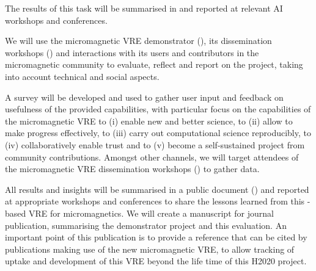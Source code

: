 \begin{workpackage}[id=social-aspects,wphases=0-48,
  title=Social Aspects,
  lead=UO,
  UORM=23,USHRM=18,USORM=6]
\begin{tasklist}
\begin{task}[title=Mechanism Design for Free Software Development,PM=15,lead=UO,
  wphases=6-48!.5,id=isocial-decisionmaking]
The results of this task will be summarised in 
and reported at relevant AI workshops and conferences.
\end{task}

\begin{task}[title=Evaluation of Micromagnetic VRE,lead=USO,PM=6,
id=oommf-nb-evaluation,partners={UO,PS},wphases=28-40!0.5]
  We will use the micromagnetic VRE demonstrator
  (), its dissemination
  workshops \linebreak()
  and interactions with its users and contributors in the
  micromagnetic community to evaluate, reflect and report on the project,
  taking into account technical and social aspects.

  A survey will be developed and used to gather user input and
  feedback on usefulness of the provided capabilities, with particular
  focus on the capabilities of the micromagnetic VRE to (i) enable new
  and better science, to (ii) allow to make progress effectively, to
  (iii) carry out computational science reproducibly, to (iv)
  collaboratively enable trust and to (v) become a self-sustained
  project from community contributions. Amongst other channels, we
  will target attendees of the micromagnetic VRE dissemination
  workshops () to
  gather data.

  All results and insights will be summarised in a public document
  () and reported at appropriate
  workshops and conferences to share the lessons learned from this
  \Jupyter-based VRE for micromagnetics. We will create a manuscript
  for journal publication, summarising the demonstrator project and
  this evaluation. An important point of this publication is to
  provide a reference that can be cited by publications making use of
  the new micromagnetic VRE, to allow tracking of uptake and
  development of this VRE beyond the life time of this H2020 project.
\end{task}



\end{tasklist}



\end{workpackage}
